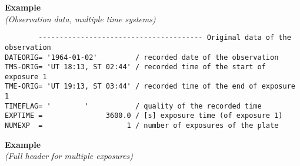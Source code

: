 \documentclass[11pt]{ivoa}
\newenvironment{fitsexample}[1]
{\bigskip\noindent\textbf{Example}\\\textit{(#1)\smallskip}}
{\medskip}
\begin{document}
\begin{fitsexample}{Observation data, multiple time systems}
\begin{lstlisting}
        --------------------------------------- Original data of the observation
DATEORIG= '1964-01-02'         / recorded date of the observation
TMS-ORIG= 'UT 18:13, ST 02:44' / recorded time of the start of exposure 1
TME-ORIG= 'UT 19:13, ST 03:44' / recorded time of the end of exposure 1
TIMEFLAG= '        '           / quality of the recorded time
EXPTIME =               3600.0 / [s] exposure time (of exposure 1)
NUMEXP  =                    1 / number of exposures of the plate
\end{lstlisting}
\end{fitsexample}


\begin{fitsexample}{Full header for multiple exposures}


\end{fitsexample}
\end{document}
